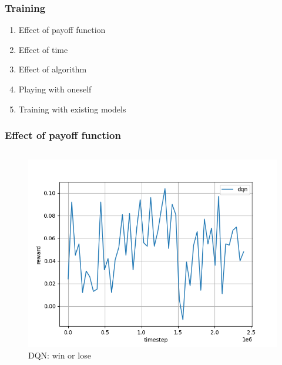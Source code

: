 \begin{frame}
\frametitle{Training}
\begin{enumerate}
\item Effect of payoff function
\item Effect of time
\item Effect of algorithm
\item Playing with oneself
\item Training with existing models
\end{enumerate}
\end{frame}


\begin{frame}
\frametitle{Effect of payoff function}

\begin{columns}

\begin{column}[t]{.5\textwidth}
\begin{figure}
\includegraphics[width=\textwidth]{dqn-no-specific-payoff.png}
\caption{DQN: win or lose}
\end{figure}
\end{column}


\end{columns}
\end{frame}
